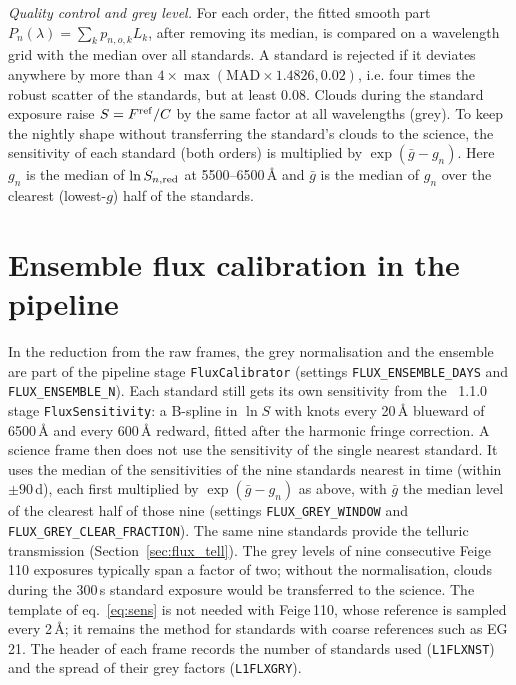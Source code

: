 \textit{Quality control and grey level.} For each order, the fitted smooth part $P_n(\lambda)=\sum_k p_{n,o,k}L_k$,
after removing its median, is compared on a wavelength grid with the median over all standards. A standard is rejected
if it deviates anywhere by more than $4\times\max(\mathrm{MAD}\times1.4826, 0.02)$, i.e. four times the robust scatter
of the standards, but at least 0.08. Clouds during the standard exposure raise $S=F^{\rm ref}/C$ by the same factor at
all wavelengths (grey). To keep the nightly shape without transferring the standard's clouds to the science, the
sensitivity of each standard (both orders) is multiplied by $\exp(\bar g-g_n)$. Here $g_n$ is the median of
$\ln S_{n,{\rm red}}$ at 5500--6500\,\AA{} and $\bar g$ is the median of $g_n$ over the clearest (lowest-$g$) half of
the standards.

\section{Ensemble flux calibration in the pipeline}
\label{sec:flux_ensemble}
In the reduction from the raw frames, the grey normalisation and the ensemble are part of the pipeline stage
\texttt{FluxCalibrator} (settings \texttt{FLUX\_ENSEMBLE\_DAYS} and \texttt{FLUX\_ENSEMBLE\_N}). Each standard still
gets its own sensitivity from the \banzai{}~1.1.0 stage \texttt{FluxSensitivity}: a B-spline in $\ln S$ with knots
every 20\,\AA{} blueward of 6500\,\AA{} and every 600\,\AA{} redward, fitted after the harmonic fringe correction. A
science frame then does not use the sensitivity of the single nearest standard. It uses the median of the
sensitivities of the nine standards nearest in time (within $\pm90$\,d), each first multiplied by $\exp(\bar g-g_n)$ as
above, with $\bar g$ the median level of the clearest half of those nine (settings \texttt{FLUX\_GREY\_WINDOW} and
\texttt{FLUX\_GREY\_CLEAR\_FRACTION}). The same nine standards provide the telluric transmission
(Section~\ref{sec:flux_tell}). The grey levels of nine consecutive Feige\,110 exposures typically span a factor of two;
without the normalisation, clouds during the 300\,s standard exposure would be transferred to the science. The
template of eq.~\ref{eq:sens} is not needed with Feige\,110, whose reference is sampled every 2\,\AA; it remains the
method for standards with coarse references such as EG\,21. The header of each frame records the number of standards
used (\texttt{L1FLXNST}) and the spread of their grey factors (\texttt{L1FLXGRY}).

